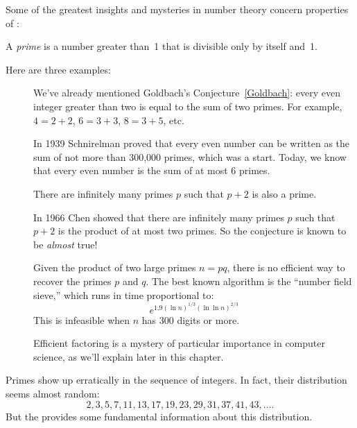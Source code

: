 Some of the greatest insights and mysteries in number theory concern
properties of  :
\begin{definition}
A \emph{prime} is a number greater than~1 that is divisible only by
itself and~1.
\end{definition}

Here are three examples:


\begin{description}

\item[] We've already mentioned Goldbach's
  Conjecture~\ref{Goldbach}: every even integer greater than two is
  equal to the sum of two primes.  For example, $4 = 2 + 2$, $6 = 3 +
  3$, $8 = 3 + 5$, etc.

  In 1939 Schnirelman proved that every even number can be written as
  the sum of not more than 300,000 primes, which was a start.  Today,
  we know that every even number is the sum of at most 6 primes.

\item[] There are infinitely many primes
  $p$ such that $p + 2$ is also a prime.

  In 1966 Chen showed that there are infinitely many primes $p$ such
  that $p + 2$ is the product of at most two primes.  So the
  conjecture is known to be \emph{almost} true!

\item[] Given the product
  of two large primes $n = pq$, there is no efficient way to recover
  the primes $p$ and $q$.  The best known algorithm is the ``number
  field sieve,'' which runs in time proportional to:
  \[
  e^{1.9(\ln n)^{1/3} (\ln\ln n)^{2/3}}
  \]
  This is infeasible when $n$ has 300 digits or more.

  Efficient factoring is a mystery of particular importance in
  computer science, as we'll explain later in this chapter.
\end{description}

Primes show up erratically in the sequence of integers.  In fact,
their distribution seems almost random:
\[
2, 3, 5, 7, 11, 13, 17, 19, 23, 29, 31, 37, 41, 43, \dots.
\]
But the  provides some fundamental
information about this distribution.

